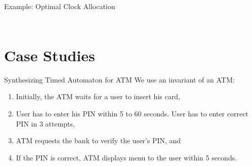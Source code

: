 \documentclass[10pt]{beamer}
\theoremstyle{plain}
\theoremstyle{definition}
\begin{document}
\begin{frame}{Example: Optimal Clock Allocation}
\begin{columns}[T]
\begin{column}{0.5\textwidth}
\begin{figure}
\begin{adjustbox}{max totalsize={.99\textwidth}{.75\textheight},center}
				\end{adjustbox}
			\end{figure}
		\end{column}
	\end{columns}
\end{frame}

\section{Case Studies}

\begin{frame}{Synthesizing Timed Automaton for ATM}
	We use an invariant of an ATM:
	\begin{enumerate}
		\item Initially, the ATM waits for a user to insert his card,
		\item User has to enter his PIN within 5 to 60 seconds. User has to enter correct PIN in 3 attempts,
		\item ATM requests the bank to verify the user's PIN, and
		\item If the PIN is correct, ATM displays menu to the user within 5 seconds.
	\end{enumerate}
\end{frame}
\end{document}
